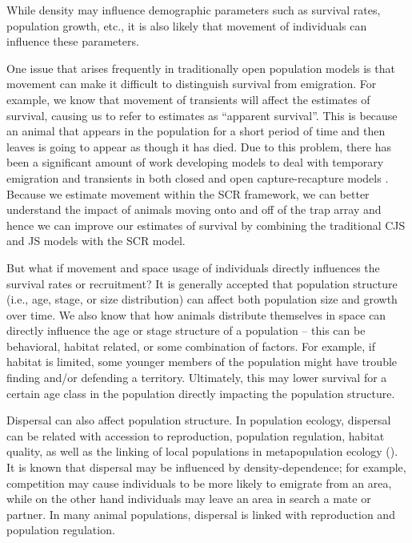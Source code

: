 While density may influence demographic parameters such as %
survival rates, population growth, etc., it is also likely that movement of individuals
can influence these parameters.  

One issue that arises frequently in traditionally open population models is that movement can
make it difficult to distinguish survival from emigration.
For example, we know that movement of transients will affect
the estimates of survival, causing us to refer to estimates as ``apparent survival''.
This is because an animal that appears in the population for a short period of time and then leaves
is going to appear as though it has died.  Due to this problem, there has been a significant amount
of work developing models to deal with temporary emigration and transients in both closed and open capture-recapture models 
\citep{kendall_etal:1997, pradel_hines:1997, hines_etal:2003, clavel_etal:2008}.  Because we estimate movement
within the SCR framework, we can better understand the impact of animals moving onto and off of the trap
array and hence we can improve our estimates of survival by combining the traditional CJS and JS models with
the SCR model. 



But
what if movement and space usage of individuals directly influences
the survival rates or recruitment?
It is generally accepted that population structure (i.e., age, stage, or size distribution) can affect
 both population size and growth over time.
We also know that how animals distribute themselves in space
can directly influence the age or stage structure of a population -- this can be behavioral, habitat
related, or some combination of factors.
For example, if habitat is limited, 
some younger members of the population might have trouble finding
and/or defending a territory.  Ultimately, this may lower survival for a certain age class in the population directly
impacting the population structure.

Dispersal can also affect population structure.  In population ecology, dispersal can be related with accession to reproduction, 
population regulation, habitat quality, as well as the linking of local populations in metapopulation 
ecology (\cite{clobert_etal:2001, ovaskainen_etal:2008}).   It is known
that dispersal may be influenced by density-dependence; for example, competition may cause individuals
to be more likely to emigrate from an area, while on the other hand individuals may leave an area in search 
a mate or partner.  
In many
animal populations, dispersal is linked with reproduction and
population regulation.

